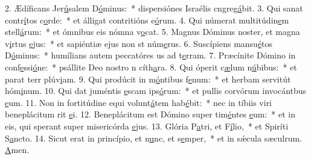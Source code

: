 2. Ædíficans Jer\uline{ú}salem D\uline{ó}minus:~* dispersiónes Israélis cngreg\uline{á}bit.
3. Qui sanat contr\uline{í}tos c\uline{o}rde:~* et álligat contritións e\uline{ó}rum.
4. Qui númerat multitúdin\uline{e}m stell\uline{á}rum:~* et ómnibus eis nómna v\uline{o}cat.
5. Magnus Dóminus noster, et magna v\uline{i}rtus \uline{e}jus:~* et sapiéntiæ ejus non st núm\uline{e}rus.
6. Suscípiens mansu\uline{é}tos D\uline{ó}minus:~* humílians autem peccatóres us ad t\uline{e}rram.
7. Præcínite Dómino in conf\uline{e}ssi\uline{ó}ne:~* psállite Deo nostro n cíth\uline{a}ra.
8. Qui óperit c\uline{æ}lum n\uline{ú}bibus:~* et parat terr plúv\uline{i}am.
9. Qui prodúcit in m\uline{ó}ntibus f\uline{e}num:~* et herbam servitút hóm\uline{i}num.
10. Qui dat juméntis \uline{e}scam ips\uline{ó}rum:~* et pullis corvórum invocántbus \uline{e}um.
11. Non in fortitúdine equi volunt\uline{á}tem hab\uline{é}bit:~* nec in tíbiis viri beneplácitum rit \uline{e}i.
12. Beneplácitum est Dómino super tim\uline{é}ntes \uline{e}um:~* et in eis, qui sperant super misericórda \uline{e}jus.
13. Glória P\uline{a}tri, et F\uline{í}lio,~* et Spiríti S\uline{a}ncto.
14. Sicut erat in princípio, et n\uline{u}nc, et s\uline{e}mper,~* et in sǽcula sæculrum. \uline{A}men.
